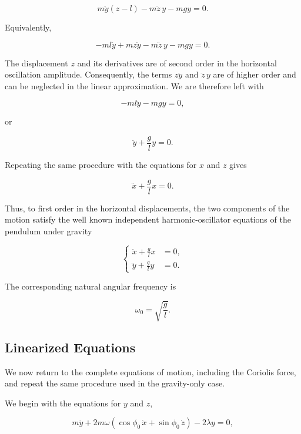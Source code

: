 \documentclass[12pt]{article}
\begin{document}
\[
  m\ddot{y}(z-l)
  -
  m\ddot{z}\,y
  -
  mgy
  =
  0.
\]

Equivalently,

\[
  -ml\ddot{y}
  +
  mz\ddot{y}
  -
  m\ddot{z}\,y
  -
  mgy
  =
  0.
\]

The displacement \(z\) and its derivatives are of second order in the horizontal
oscillation amplitude. Consequently, the terms \(z\ddot{y}\) and
\(\ddot{z}\,y\) are of higher order and can be neglected in the linear
approximation. We are therefore left with

\[
  -ml\ddot{y}-mgy=0,
\]

or

\begin{equation}
  \ddot{y}+\frac{g}{l}y=0.
  \label{eq:pendulum-y-equation}
\end{equation}

Repeating the same procedure with the equations for \(x\) and \(z\) gives

\begin{equation}
  \ddot{x}+\frac{g}{l}x=0.
  \label{eq:pendulum-x-equation}
\end{equation}

Thus, to first order in the horizontal displacements, the two components of the
motion satisfy the well known independent harmonic-oscillator equations of the pendulum under gravity

\begin{equation}
  \left\{
  \begin{aligned}
    \ddot{x}+\frac{g}{l}x&=0,
    \\
    \ddot{y}+\frac{g}{l}y&=0.
  \end{aligned}
  \right.
  \label{eq:ordinary-pendulum-linearized}
\end{equation}

The corresponding natural angular frequency is

\[
  \omega_0=\sqrt{\frac{g}{l}}.
\]

\subsection{Linearized Equations}

We now return to the complete equations of motion, including the Coriolis force,
and repeat the same procedure used in the gravity-only case.

We begin with the equations for \(y\) and \(z\),

\[
  m\ddot{y}
  +
  2m\omega
  \left(
    \cos\phi_0\,\dot{x}
    +
    \sin\phi_0\,\dot{z}
  \right)
  -
  2\lambda y
  =
  0,
\]
\end{document}
